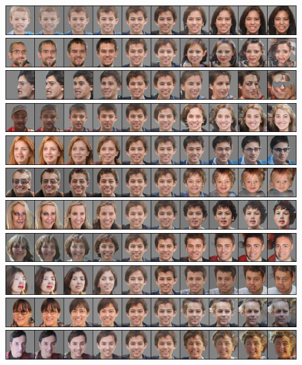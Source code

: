 \documentclass{article}
\begin{document}
\begin{figure}[H]
  \centering
  \includegraphics[width=0.9\linewidth]{eigen/grey_gan_0.png}
  \includegraphics[width=0.9\linewidth]{eigen/grey_gan_1.png}
  \includegraphics[width=0.9\linewidth]{eigen/grey_gan_2.png}
  \includegraphics[width=0.9\linewidth]{eigen/grey_gan_3.png}
  \includegraphics[width=0.9\linewidth]{eigen/grey_gan_4.png}
  \includegraphics[width=0.9\linewidth]{eigen/grey_gan_5.png}
  \includegraphics[width=0.9\linewidth]{eigen/grey_gan_6.png}
  \includegraphics[width=0.9\linewidth]{eigen/grey_gan_7.png}
  \includegraphics[width=0.9\linewidth]{eigen/grey_gan_8.png}
  \includegraphics[width=0.9\linewidth]{eigen/grey_gan_9.png}
  \includegraphics[width=0.9\linewidth]{eigen/grey_gan_10.png}

\end{figure}
\end{document}
